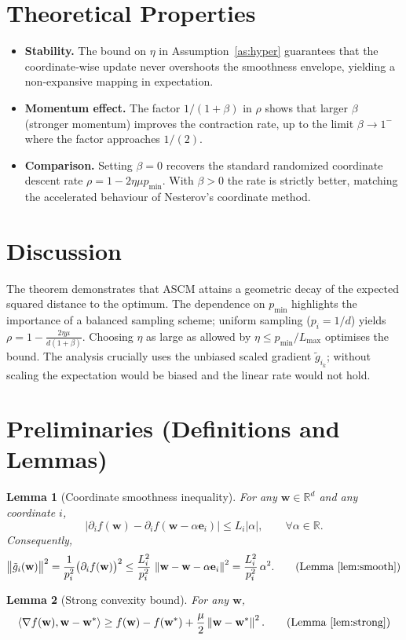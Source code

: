 \documentclass{article}
\newtheorem{lemma}{Lemma}
\newcommand{\R}{\mathbb{R}}
\newcommand{\norm}[1]{\left\|#1\right\|}
\begin{document}
\section*{Theoretical Properties}
\begin{itemize}[nosep]
    \item \textbf{Stability.} The bound on $\eta$ in Assumption~\ref{as:hyper}
          guarantees that the coordinate‑wise update never overshoots the
          smoothness envelope, yielding a non‑expansive mapping in expectation.
    \item \textbf{Momentum effect.} The factor $1/(1+\beta)$ in $\rho$ shows that
          larger $\beta$ (stronger momentum) improves the contraction rate,
          up to the limit $\beta\to1^{-}$ where the factor approaches $1/(2)$.
    \item \textbf{Comparison.} Setting $\beta=0$ recovers the standard
          randomized coordinate descent rate $\rho=1-2\eta\mu p_{\min}$.
          With $\beta>0$ the rate is strictly better, matching the
          accelerated behaviour of Nesterov’s coordinate method.
\end{itemize}

\section*{Discussion}
The theorem demonstrates that ASCM attains a geometric decay of the
expected squared distance to the optimum.  The dependence on $p_{\min}$
highlights the importance of a balanced sampling scheme; uniform sampling
($p_i=1/d$) yields $\rho=1-\frac{2\eta\mu}{d(1+\beta)}$.
Choosing $\eta$ as large as allowed by $\eta\le p_{\min}/L_{\max}$
optimises the bound.  The analysis crucially uses the unbiased scaled
gradient $\tilde g_{i_k}$; without scaling the expectation would be biased
and the linear rate would not hold.

\newpage
\section*{Preliminaries (Definitions and Lemmas)}
\begin{lemma}[Coordinate smoothness inequality]\label{lem:smooth}
For any $\mathbf w\in\R^{d}$ and any coordinate $i$,
\[
\bigl|\partial_i f(\mathbf w)-\partial_i f(\mathbf w-\alpha\mathbf e_i)\bigr|
\le L_i |\alpha|,\qquad\forall\alpha\in\R .
\]
Consequently,
\[
\bigl\|\tilde g_{i}(\mathbf w)\bigr\|^{2}
=\frac{1}{p_i^{2}}\bigl(\partial_i f(\mathbf w)\bigr)^{2}
\le \frac{L_i^{2}}{p_i^{2}}\,\norm{\mathbf w-\mathbf w-\alpha\mathbf e_i}^{2}
=\frac{L_i^{2}}{p_i^{2}}\,\alpha^{2}.
\tag{Lemma~\ref{lem:smooth}}
\]
\end{lemma}
\begin{lemma}[Strong convexity bound]\label{lem:strong}
For any $\mathbf w$,
\[
\langle\nabla f(\mathbf w),\mathbf w-\mathbf w^{*}\rangle
\ge f(\mathbf w)-f(\mathbf w^{*})+\frac{\mu}{2}\norm{\mathbf w-\mathbf w^{*}}^{2}.
\tag{Lemma~\ref{lem:strong}}
\]
\end{lemma}
\end{document}
